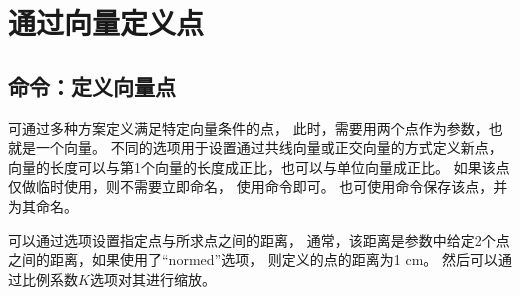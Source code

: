 \documentclass[../main.tex]{subfiles}
\begin{document}
\section{通过向量定义点}

\subsection{命令：定义向量点}

可通过多种方案定义满足特定向量条件的点，
此时，需要用两个点作为参数，也就是一个向量。
不同的选项用于设置通过共线向量或正交向量的方式定义新点，
向量的长度可以与第1个向量的长度成正比，也可以与单位向量成正比。
如果该点仅做临时使用，则不需要立即命名，
使用命令即可。
也可使用命令保存该点，并为其命名。

可以通过选项设置指定点与所求点之间的距离，
通常，该距离是参数中给定2个点之间的距离，如果使用了\enquote{normed}选项，
则定义的点的距离为1 cm。
然后可以通过比例系数$K$选项对其进行缩放。
\end{document}
